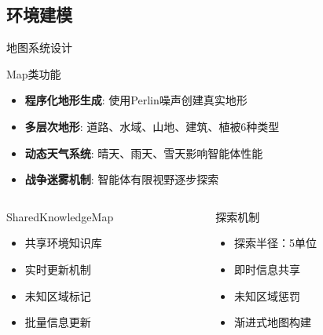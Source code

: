 \documentclass[
10pt,
aspectratio=169,
]{beamer}
\begin{document}
\subsection{环境建模}

\begin{frame}{地图系统设计}
    \begin{block}{Map类功能}
        \begin{itemize}
            \item \textbf{程序化地形生成}: 使用Perlin噪声创建真实地形
            \item \textbf{多层次地形}: 道路、水域、山地、建筑、植被6种类型
            \item \textbf{动态天气系统}: 晴天、雨天、雪天影响智能体性能
            \item \textbf{战争迷雾机制}: 智能体有限视野逐步探索
        \end{itemize}
    \end{block}
    
    \begin{columns}
        \begin{column}{0.5\textwidth}
            \begin{exampleblock}{SharedKnowledgeMap}
                \begin{itemize}
                    \item 共享环境知识库
                    \item 实时更新机制
                    \item 未知区域标记
                    \item 批量信息更新
                \end{itemize}
            \end{exampleblock}
        \end{column}
        \begin{column}{0.5\textwidth}
            \begin{alertblock}{探索机制}
                \begin{itemize}
                    \item 探索半径：5单位
                    \item 即时信息共享
                    \item 未知区域惩罚
                    \item 渐进式地图构建
                \end{itemize}
            \end{alertblock}
        \end{column}
    \end{columns}
\end{frame}
\end{document}
